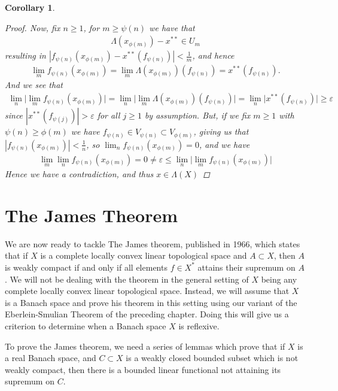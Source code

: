 \documentclass[10pt,twoside,openany,final]{memoir}
\theoremstyle{break}
\newtheorem{corollary}[section]{Corollary}
\theoremstyle{Break}
\begin{document}
\begin{corollary}
\begin{proof}
\noindent Now, fix $n \geq 1$, for $m \geq \psi(n)$ we have that 
\begin{align*}
\Lambda(x_{\phi(m)})-x^{**} \in U_{m} 
\end{align*}
resulting in $|f_{\psi(n)}(x_{\phi(m)})-x^{**}(f_{\psi(n)})| < \frac{1}{m}$, and hence 
\begin{align*}
\lim_{m} f_{\psi(n)} (x_{\phi(m)})=\lim_{m} \Lambda(x_{\phi(m)})(f_{\psi(n)})=x^{**}(f_{\psi(n)}).
\end{align*} 
And we see that
\begin{align*}
\lim_{n}\big| \lim_{m} f_{\psi(n)} (x_{\phi(m)}) \big|=\lim_{n}\big| \lim_{m} \Lambda(x_{\phi(m)})(f_{\psi(n)})\big| =\lim_{n}\big| x^{**}(f_{\psi(n)})\big| \geq \varepsilon
\end{align*}
since $|x^{**}(f_{\psi(j)})|> \varepsilon$ for all $j\geq 1$ by assumption. But, if we fix $m \geq 1$ with $\psi(n) \geq \phi(m)$ we have $f_{\psi(n)} \in V_{\psi(n)} \subset V_{\phi(m)}$, giving us that $|f_{\psi(n)}(x_{\phi(m)})| < \frac{1}{n}$, so $\lim_{n} f_{\psi(n)}(x_{\phi(m)})=0$, and we have 
\begin{align*}
\lim_{m} \lim_{n} f_{\psi(n)} (x_{\phi(m)})=0 \neq \varepsilon \leq \lim_{n} \big| \lim_{m} f_{\psi(n)} (x_{\phi(m)}) \big|
\end{align*}
Hence we have a contradiction, and thus $x \in \Lambda(X)$
\end{proof}
\end{corollary}

\chapter{The James Theorem}
We are now ready to tackle The James theorem, published in 1966, which states that if $X$ is a complete locally convex linear topological space and $A\subset X$, then $A$ is weakly compact if and only if all elements $f \in X^*$ attains their supremum on $A$. We will not be dealing with the theorem in the general setting of $X$ being any complete locally convex linear topological space. Instead, we will assume that $X$ is a Banach space and prove his theorem in this setting using our variant of the Eberlein-Smulian Theorem of the preceding chapter. Doing this will give us a criterion to determine when a Banach space $X$ is reflexive.

\noindent To prove the James theorem, we need a series of lemmas which prove that if $X$ is a real Banach space, and $C \subset X$ is a weakly closed bounded subset which is not weakly compact, then there is a bounded linear functional not attaining its supremum on $C$. 
\end{document}
